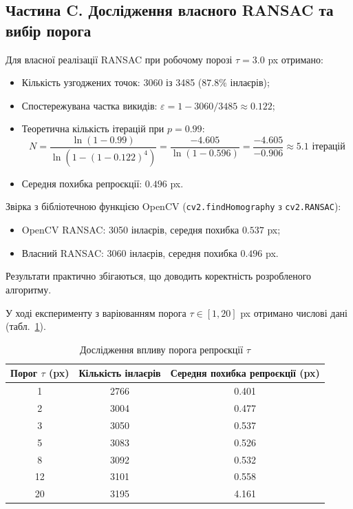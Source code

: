 \documentclass[12pt, a4paper]{article}
\begin{document}
	\begin{figure}[ht]
		\centering
	\end{figure}
	
	\subsection{Частина C. Дослідження власного RANSAC та вибір порога}
	Для власної реалізації RANSAC при робочому порозі $\tau = 3.0$ px отримано:
	\begin{itemize}
		\item Кількість узгоджених точок: 3060 із 3485 ($87.8\%$ інлаєрів);
		\item Спостережувана частка викидів: $\varepsilon = 1 - 3060/3485 \approx 0.122$;
		\item Теоретична кількість ітерацій при $p=0.99$:
		\begin{equation*}
			N = \frac{\ln(1 - 0.99)}{\ln(1 - (1 - 0.122)^4)} = \frac{-4.605}{\ln(1 - 0.596)} = \frac{-4.605}{-0.906} \approx 5.1 \text{ ітерацій}
		\end{equation*}
		\item Середня похибка репроєкції: $0.496$ px.
	\end{itemize}
	
	Звірка з бібліотечною функцією OpenCV (\texttt{cv2.findHomography} з \texttt{cv2.RANSAC}):
	\begin{itemize}
		\item OpenCV RANSAC: 3050 інлаєрів, середня похибка $0.537$ px;
		\item Власний RANSAC: 3060 інлаєрів, середня похибка $0.496$ px.
	\end{itemize}
	Результати практично збігаються, що доводить коректність розробленого алгоритму.
	
	У ході експерименту з варіюванням порога $\tau \in [1, 20]$ px отримано числові дані (табл.~\ref{tab:tau}).
	
	\begin{table}[ht]
		\centering
		\caption{Дослідження впливу порога репроєкції $\tau$}
		\label{tab:tau}
		\begin{tabular}{ccc}
			\toprule
			\textbf{Порог $\tau$ (px)} & \textbf{Кількість інлаєрів} & \textbf{Середня похибка репроєкції (px)} \\
			\midrule
			1 & 2766 & 0.401 \\
			2 & 3004 & 0.477 \\
			3 & 3050 & 0.537 \\
			5 & 3083 & 0.526 \\
			8 & 3092 & 0.532 \\
			12 & 3101 & 0.558 \\
			20 & 3195 & 4.161 \\
			\bottomrule
		\end{tabular}
	\end{table}
	
\end{document}
